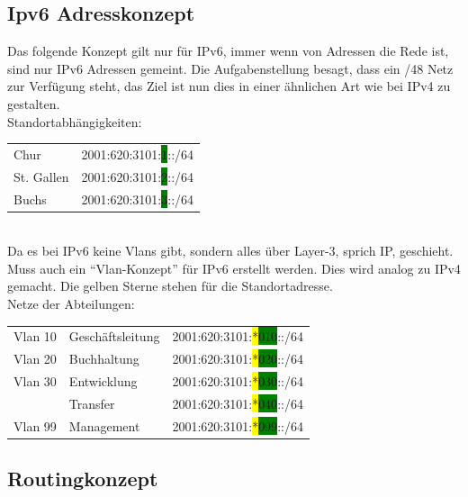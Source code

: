 \documentclass[12pt,a4paper,titlepage]{article}
\begin{document}
\subsection{Ipv6 Adresskonzept} 
Das folgende Konzept gilt nur für IPv6, immer wenn von Adressen die Rede ist, sind nur IPv6 Adressen gemeint.
Die Aufgabenstellung besagt, dass ein /48 Netz zur Verfügung steht, das Ziel ist nun dies in einer ähnlichen Art wie bei IPv4 zu gestalten. \\
\newline
Standortabhängigkeiten:\\ 
\newline
\hspace*{1cm} 
\begin{tabular}{ll}
    Chur & 2001:620:3101:\colorbox{green}{1}::/64\\
    St. Gallen & 2001:620:3101:\colorbox{green}{2}::/64\\
    Buchs & 2001:620:3101:\colorbox{green}{3}::/64\\
\end{tabular}\\
\newline
Da es bei IPv6 keine Vlans gibt, sondern alles über Layer-3, sprich IP, geschieht. Muss auch ein “Vlan-Konzept” für IPv6 erstellt werden. Dies wird analog zu IPv4 gemacht. Die gelben Sterne stehen für die Standortadresse.\\\newline
Netze der Abteilungen: \\
\newline
\hspace*{1cm} 
\begin{tabular}{lll}
     Vlan 10 & Geschäftsleitung & 2001:620:3101:\colorbox{yellow}{*}\colorbox{green}{010}::/64\\
     Vlan 20 & Buchhaltung & 2001:620:3101:\colorbox{yellow}{*}\colorbox{green}{020}::/64\\
     Vlan 30 & Entwicklung & 2001:620:3101:\colorbox{yellow}{*}\colorbox{green}{030}::/64\\
             & Transfer & 2001:620:3101:\colorbox{yellow}{*}\colorbox{green}{040}::/64\\
     Vlan 99 & Management & 2001:620:3101:\colorbox{yellow}{*}\colorbox{green}{099}::/64\\
\end{tabular}
\newpage



\subsection{Routingkonzept} 
\end{document}
